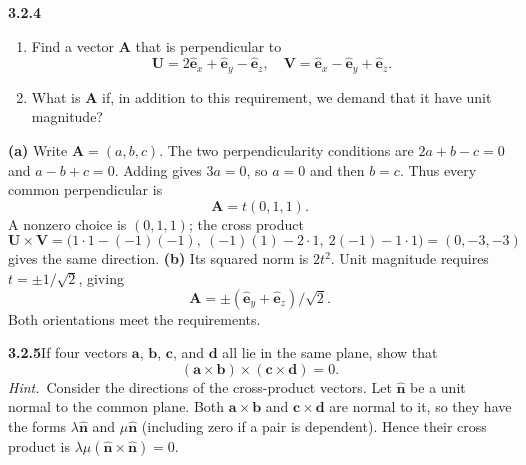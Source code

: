 \par\bigskip
\noindent\textbf{3.2.4}\quad
\begin{enumerate}
\item[(a)] Find a vector $\mathbf{A}$ that is perpendicular to
  \[
  \mathbf{U}=2\hat{\mathbf{e}}_{x}+\hat{\mathbf{e}}_{y}-\hat{\mathbf{e}}_{z},
  \quad
  \mathbf{V}=\hat{\mathbf{e}}_{x}-\hat{\mathbf{e}}_{y}+\hat{\mathbf{e}}_{z}.
  \]
\item[(b)] What is $\mathbf{A}$ if, in addition to this requirement, we demand
  that it have unit magnitude?
\end{enumerate}
\solution
\textbf{(a)} Write $\mathbf A=(a,b,c)$. The two perpendicularity
conditions are $2a+b-c=0$ and $a-b+c=0$. Adding gives $3a=0$,
so $a=0$ and then $b=c$. Thus every common perpendicular is
\[
\mathbf A=t(0,1,1).
\]
A nonzero choice is $(0,1,1)$; the cross product
\[
\mathbf U\times\mathbf V
=\bigl(1\cdot1-(-1)(-1),\ (-1)(1)-2\cdot1,\ 2(-1)-1\cdot1\bigr)
=(0,-3,-3)
\]
gives the same direction.
\textbf{(b)} Its squared norm is $2t^2$. Unit magnitude requires
$t=\pm1/\sqrt2$, giving
\[
\boxed{\mathbf A=\pm(\hat{\mathbf e}_y+\hat{\mathbf e}_z)/\sqrt2}.
\]
Both orientations meet the requirements.

\par\bigskip
\noindent\textbf{3.2.5}\quad If four vectors $\mathbf{a}$, $\mathbf{b}$,
$\mathbf{c}$, and $\mathbf{d}$ all lie in the same plane, show that
\[
(\mathbf{a}\times\mathbf{b})\times(\mathbf{c}\times\mathbf{d})=0.
\]
\emph{Hint.}~Consider the directions of the cross-product vectors.
\solution
Let $\hat{\mathbf n}$ be a unit normal to the common plane.
Both $\mathbf a\times\mathbf b$ and $\mathbf c\times\mathbf d$
are normal to it, so they have the forms $\lambda\hat{\mathbf n}$
and $\mu\hat{\mathbf n}$ (including zero if a pair is dependent).
Hence their cross product is
$\lambda\mu(\hat{\mathbf n}\times\hat{\mathbf n})=0$.


